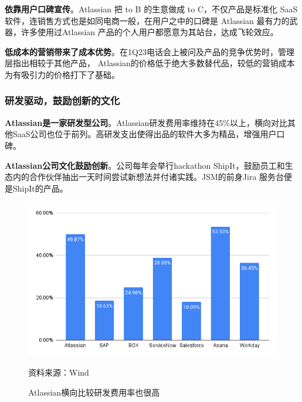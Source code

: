 \textbf{依靠用户口碑宣传}。Atlassian 把 to B 的生意做成 to C，不仅产品是标准化 SaaS 软件，连销售方式也是如同电商一般，在用户之中的口碑是 Atlassian 最有力的武器，许多使用过Atlassian 产品的个人用户都愿意为其站台，达成飞轮效应。

\textbf{低成本的营销带来了成本优势}。在1Q23电话会上被问及产品的竞争优势时，管理层指出相较于其他产品， Atlassian的价格低于绝大多数替代品，较低的营销成本为有吸引力的价格打下了基础。

\subsubsection{研发驱动，鼓励创新的文化}

\textbf{Atlassian是一家研发型公司}。Atlassian研发费用率维持在45\%以上，横向对比其他SaaS公司也位于前列。高研发支出使得出品的软件大多为精品，增强用户口碑。

\textbf{Atlassian公司文化鼓励创新}。公司每年会举行hackathon ShipIt，鼓励员工和生态内的合作伙伴抽出一天时间尝试新想法并付诸实践。JSM的前身Jira 服务台便是ShipIt的产品。
\begin{figure}[H]
    \caption{Atlassian横向比较研发费用率也很高}
    \begin{center}
        \includegraphics[width=0.9\linewidth]{img/RD.png}
    \end{center}
    \footnotesize{资料来源：Wind}
\end{figure}
